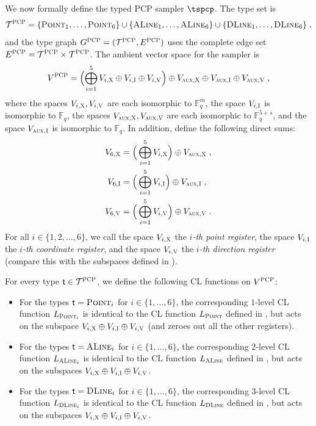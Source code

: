 \documentclass[11pt]{article}
\theoremstyle{definition}
\newcommand{\F}{\ensuremath{\mathbb{F}}}
\newcommand{\type}{\mathcal{T}}
\newcommand{\gamestyle}[1]{\ensuremath{\textsc{#1}}\xspace}
\newcommand{\pcp}{\gamestyle{PCP}}
\newcommand{\labelstyle}[1]{\ensuremath{\textsc{#1}}\xspace}
\newcommand{\aux}{\labelstyle{aux}}
\newcommand{\xpt}{\labelstyle{X}}
\newcommand{\dir}[1]{\labelstyle{V#1}}
\newcommand{\coord}{\labelstyle{I}}
\newcommand{\tvarstyle}[1]{\mathsf{#1}}
\newcommand{\tvar}{\ensuremath{\tvarstyle{t}}}
\newcommand{\typestyle}[1]{\ensuremath{\textsc{#1}}\xspace}
\newcommand{\Point}{\typestyle{Point}}
\newcommand{\ALine}{\typestyle{ALine}}
\newcommand{\DLine}{\typestyle{DLine}}
\begin{document}
We now formally define the typed PCP sampler $\tspcp$. The type set is
\begin{equation*}
  \type^\pcp = \{ \Point_1, \ldots,\Point_6\} \cup \{\ALine_1,
  \dots, \ALine_6\} \cup \{\DLine_1,
  \dots, \DLine_6\}\;,
\end{equation*}
and the type graph $G^\pcp=(\type^\pcp,E^\pcp)$ uses the complete edge set
$E^\pcp = \type^\pcp \times \type^\pcp$.
The ambient vector space for the sampler is
\begin{equation}
  \label{eq:V-pcp}
  V^\pcp = \Bigl( \bigoplus_{i=1}^{5} V_{i, \xpt} \oplus V_{i, \coord} \oplus
  V_{i, \dir{}}\Bigr) \oplus V_{\aux, \xpt} \oplus V_{\aux, \coord} \oplus
  V_{\aux, \dir{}}\;,
\end{equation}
where the spaces $V_{i,\xpt}, V_{i, \dir{}}$ are each isomorphic to $\F_q^m$,
the space $V_{i, \coord}$ is isomorphic to $\F_{q}$, the spaces $V_{\aux, \xpt},
V_{\aux, \dir{}}$ are each isomorphic to $\F_q^{5+s}$, and the space $V_{\aux,
  \coord}$ is isomorphic to $\F_q$.
In addition, define the following direct sums:
\begin{align*}
  V_{6, \xpt} & = \Big( \bigoplus_{i=1}^{5} V_{i, \xpt} \Big) \oplus V_{\aux, \xpt}\;,\\
  V_{6, \coord} & = \Big( \bigoplus_{i=1}^{5} V_{i, \coord} \Big) \oplus
                   V_{\aux, \coord}\;,\\
  V_{6, \dir{}} & = \Big( \bigoplus_{i=1}^{5} V_{i, \dir{}} \Big) \oplus
                   V_{\aux, \dir{}}\;.
\end{align*}
For all $i \in \{1,2,\ldots,6\}$, we call the space $V_{i,\xpt}$ the
\emph{$i$-th point register}, the space $V_{i,\coord}$ the \emph{$i$-th
  coordinate register}, and the space $V_{i,\dir{}}$ the \emph{$i$-th direction
  register} (compare this with the subspaces defined in ).

For every type $\tvar \in \type^\pcp$, we define the following CL functions on
$V^\pcp$:
\begin{itemize}
\item For the types $\tvar = \Point_i$ for $i \in \{1, \dots, 6\}$, the
  corresponding $1$-level CL function $L_{\Point_i}$ is identical to the CL
  function $L_\Point$ defined in , but acts on the
  subspace $V_{i,\xpt} \oplus V_{i, \coord} \oplus V_{i,
    \dir{}}$ (and zeroes out all the other registers).

\item For the types $\tvar = \ALine_i$ for $i \in \{ 1, \dots, 6\}$, the
  corresponding $2$-level CL function $L_{\ALine_i}$ is identical to the CL
  function $L_\ALine$ defined in , but acts on the subspaces
  $V_{i,\xpt} \oplus V_{i,\coord} \oplus V_{i,\dir{}}$.
  
\item For the types $\tvar = \DLine_i$ for $i \in \{ 1, \dots, 6\}$, the
  corresponding $3$-level CL function $L_{\DLine_i}$ is identical to the CL
  function $L_\DLine$ defined in , but acts on the subspaces
  $V_{i,\xpt} \oplus V_{i,\coord} \oplus V_{i,\dir{}}$.
\end{itemize}
\end{document}
